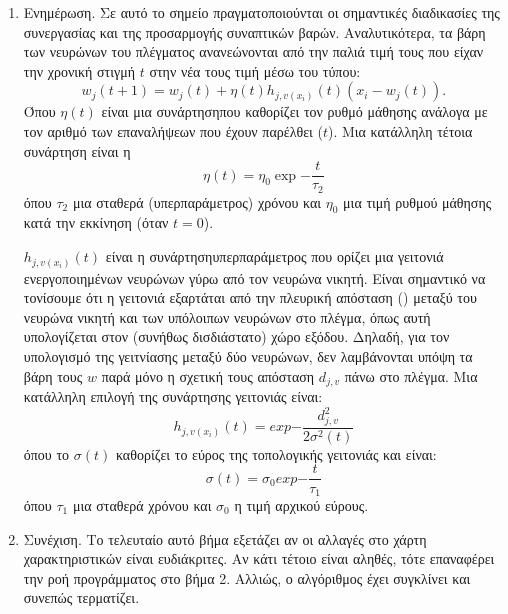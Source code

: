 \begin{enumerate}
  \item Ενημέρωση. Σε αυτό το σημείο πραγματοποιούνται οι σημαντικές διαδικασίες της συνεργασίας και της προσαρμογής συναπτικών βαρών. Αναλυτικότερα, τα βάρη των νευρώνων του πλέγματος ανανεώνονται από την παλιά τιμή τους που είχαν την χρονική στιγμή $t$ στην νέα τους τιμή μέσω του τύπου: 
  \begin{equation}
    w_j(t+1) = w_j(t) + \eta(t) h_{j,v(x_i)}(t)(x_i-w_j(t)).
  \end{equation}
  Όπου $\eta(t)$ είναι μια συνάρτηση που καθορίζει τον ρυθμό μάθησης ανάλογα με τον αριθμό των επαναλήψεων που έχουν παρέλθει ($t$). Μια κατάλληλη τέτοια συνάρτηση είναι η
  \begin{equation}
    \eta(t) = \eta_0 \exp{-\frac{t}{\tau_2}}
  \end{equation}
  όπου $\tau_2$ μια σταθερά (υπερπαράμετρος) χρόνου και $\eta_0$ μια τιμή ρυθμού μάθησης κατά την εκκίνηση (όταν $t=0$).
  
  $h_{j,v(x_i)}(t)$ είναι η συνάρτηση\textendash υπερπαράμετρος που ορίζει μια γειτονιά ενεργοποιημένων νευρώνων γύρω από τον νευρώνα νικητή. Είναι σημαντικό να τονίσουμε ότι η γειτονιά εξαρτάται από την πλευρική απόσταση  () μεταξύ του νευρώνα νικητή και των υπόλοιπων νευρώνων στο πλέγμα, όπως αυτή υπολογίζεται στον (συνήθως δισδιάστατο) χώρο εξόδου. Δηλαδή, για τον υπολογισμό της γειτνίασης μεταξύ δύο νευρώνων, δεν λαμβάνονται υπόψη τα βάρη τους $w$ παρά μόνο η σχετική τους απόσταση $d_{j,v}$ πάνω στο πλέγμα. Μια κατάλληλη επιλογή της συνάρτησης γειτονιάς είναι:
  \begin{equation}
    h_{j,v(x_i)}(t) = exp{-\frac{d^2_{j,v}}{2\sigma^2(t)}}
  \end{equation}
  όπου το $\sigma(t)$ καθορίζει το εύρος της τοπολογικής γειτονιάς και είναι:
  \begin{equation}
    \sigma(t) = \sigma_0 exp{-\frac{t}{\tau_1}}
  \end{equation}
  όπου $\tau_1$ μια σταθερά χρόνου και $\sigma_0$ η τιμή αρχικού εύρους.

  \item Συνέχιση. Το τελευταίο αυτό βήμα εξετάζει αν οι αλλαγές στο χάρτη χαρακτηριστικών είναι ευδιάκριτες. Αν κάτι τέτοιο είναι αληθές, τότε επαναφέρει την ροή προγράμματος στο βήμα 2. Αλλιώς, ο αλγόριθμος έχει συγκλίνει και συνεπώς τερματίζει.
\end{enumerate}

